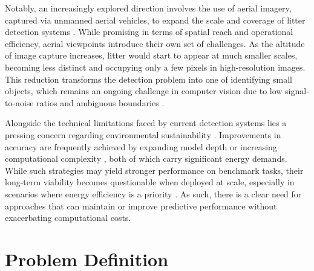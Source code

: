 Notably, an increasingly explored direction involves the use of aerial imagery, captured via unmanned aerial vehicles, to expand the scale and coverage of litter detection systems \cite{uavvaste, soda_dataset, detect_litter}. While promising in terms of spatial reach and operational efficiency, aerial viewpoints introduce their own set of challenges. As the altitude of image capture increases, litter would start to appear at much smaller scales, becoming less distinct and occupying only a few pixels in high-resolution images. This reduction transforms the detection problem into one of identifying small objects, which remains an ongoing challenge in computer vision due to low signal-to-noise ratios and ambiguous boundaries \cite{small_detection_survey, small_detection}.

Alongside the technical limitations faced by current detection systems lies a pressing concern regarding environmental sustainability \cite{sdgs}. Improvements in accuracy are frequently achieved by expanding model depth or increasing computational complexity \cite{detr, rt-detr}, both of which carry significant energy demands. While such strategies may yield stronger performance on benchmark tasks, their long-term viability becomes questionable when deployed at scale, especially in scenarios where energy efficiency is a priority \cite{pilz2024increasedcomputeefficiencydiffusion}. As such, there is a clear need for approaches that can maintain or improve predictive performance without exacerbating computational costs. 


\section{Problem Definition}
\label{sec:problem_definition}

